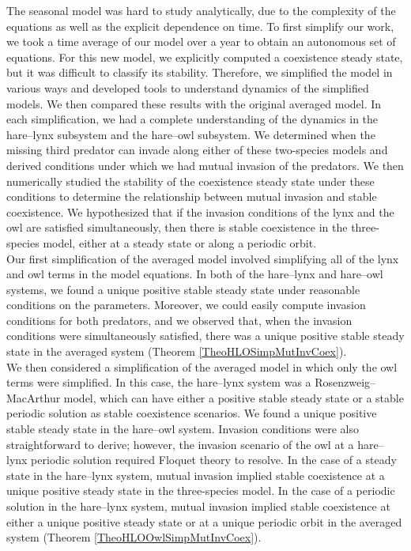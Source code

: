\documentclass[12pt]{UOthesis}
\theoremstyle{remarkstyle}
\begin{document}
The seasonal model was hard to study analytically, due to the complexity of the equations as well as the explicit dependence on time. To first simplify our work, we took a time average of our model over a year to obtain an autonomous set of equations. For this new model, we explicitly computed a coexistence steady state, but it was difficult to classify its stability. Therefore, we simplified the model in various ways and developed tools to understand dynamics of the simplified models. We then compared these results with the original averaged model. In each simplification, we had a complete understanding of the dynamics in the hare--lynx subsystem and the hare--owl subsystem. We determined when the missing third predator can invade along either of these two-species models and derived conditions under which we had mutual invasion of the predators. We then numerically studied the stability of the coexistence steady state under these conditions to determine the relationship between mutual invasion and stable coexistence. We hypothesized that if the invasion conditions of the lynx and the owl are satisfied simultaneously, then there is stable coexistence in the three-species model, either at a steady state or along a periodic orbit.\\

Our first simplification of the averaged model involved simplifying all of the lynx and owl terms in the model equations. In both of the hare--lynx and hare--owl systems, we found a unique positive stable steady state under reasonable conditions on the parameters. Moreover, we could easily compute invasion conditions for both predators, and we observed that, when the invasion conditions were simultaneously satisfied, there was a unique positive stable steady state in the averaged system (Theorem \ref{TheoHLOSimpMutInvCoex}).\\

We then considered a simplification of the averaged model in which only the owl terms were simplified. In this case, the hare--lynx system was a Rosenzweig--MacArthur model, which can have either a positive stable steady state or a stable periodic solution as stable coexistence scenarios. We found a unique positive stable steady state in the hare--owl system. Invasion conditions were also straightforward to derive; however, the invasion scenario of the owl at a hare--lynx periodic solution required Floquet theory to resolve. In the case of a steady state in the hare--lynx system, mutual invasion implied stable coexistence at a unique positive steady state in the three-species model. In the case of a periodic solution in the hare--lynx system, mutual invasion implied stable coexistence at either a unique positive steady state or at a unique periodic orbit in the averaged system (Theorem \ref{TheoHLOOwlSimpMutInvCoex}).\\
\end{document}
